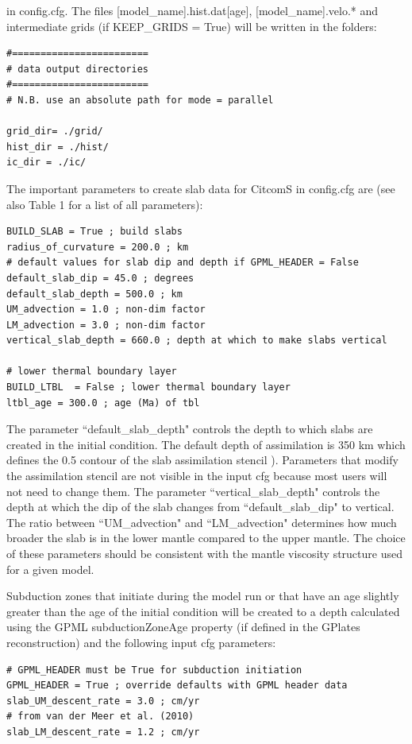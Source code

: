 \documentclass[letterpaper,12pt]{article}
\begin{document}
in config.cfg. The files [model\_name].hist.dat[age], [model\_name].velo.* and intermediate grids (if KEEP\_GRIDS = True) will be written in the folders:

\begin{verbatim}
#========================
# data output directories
#========================
# N.B. use an absolute path for mode = parallel

grid_dir= ./grid/
hist_dir = ./hist/
ic_dir = ./ic/
\end{verbatim}

The important parameters to create slab data for CitcomS in config.cfg are (see also Table 1 for a list of all parameters):

\begin{verbatim}
BUILD_SLAB = True ; build slabs
radius_of_curvature = 200.0 ; km
# default values for slab dip and depth if GPML_HEADER = False
default_slab_dip = 45.0 ; degrees
default_slab_depth = 500.0 ; km
UM_advection = 1.0 ; non-dim factor
LM_advection = 3.0 ; non-dim factor
vertical_slab_depth = 660.0 ; depth at which to make slabs vertical

# lower thermal boundary layer
BUILD_LTBL  = False ; lower thermal boundary layer
ltbl_age = 300.0 ; age (Ma) of tbl
\end{verbatim}

The parameter ``default\_slab\_depth" controls the depth to which slabs are created in the initial condition.  The default depth of assimilation is 350 km which defines the 0.5 contour of the slab assimilation stencil \citep[see][]{BGF15}).  Parameters that modify the assimilation stencil are not visible in the input cfg because most users will not need to change them.  The parameter ``vertical\_slab\_depth" controls the depth at which the dip of the slab changes from ``default\_slab\_dip" to vertical.  The ratio between ``UM\_advection" and  ``LM\_advection" determines how much broader the slab is in the lower mantle compared to the upper mantle.  The choice of these parameters should be consistent with the mantle viscosity structure used for a given model.

Subduction zones that initiate during the model run or that have an age slightly greater than the age of the initial condition will be created to a depth calculated using the GPML subductionZoneAge property (if defined in the GPlates reconstruction) and the following input cfg parameters:

\begin{verbatim}
# GPML_HEADER must be True for subduction initiation
GPML_HEADER = True ; override defaults with GPML header data
slab_UM_descent_rate = 3.0 ; cm/yr
# from van der Meer et al. (2010)
slab_LM_descent_rate = 1.2 ; cm/yr
\end{verbatim}
\end{document}
